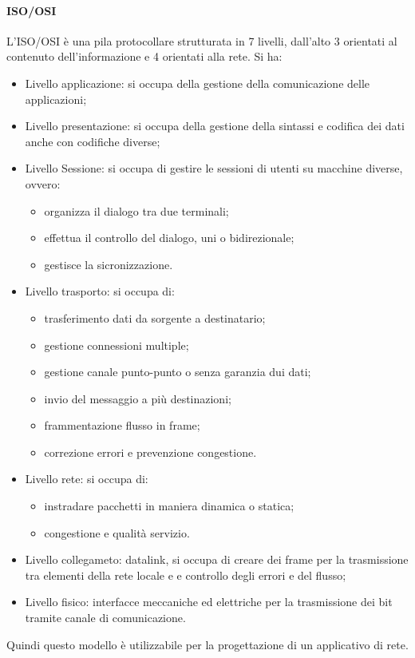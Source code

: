 \documentclass{subfiles}
\begin{document}
    \paragraph{ISO/OSI}
    L'ISO/OSI è una pila protocollare strutturata in 7 livelli, dall'alto 3 orientati al contenuto dell'informazione e 4 orientati 
    alla rete. Si ha:
    \begin{itemize}
        \item Livello applicazione: si occupa della gestione della comunicazione delle applicazioni;
        \item Livello presentazione: si occupa della gestione della sintassi e codifica dei dati anche con codifiche diverse;
        \item Livello Sessione: si occupa di gestire le sessioni di utenti su macchine diverse, ovvero:
            \begin{itemize}
                \item organizza il dialogo tra due terminali;
                \item effettua il controllo del dialogo, uni o bidirezionale;
                \item gestisce la sicronizzazione.
            \end{itemize}
        \item Livello trasporto: si occupa di:
            \begin{itemize}
                \item trasferimento dati da sorgente a destinatario;
                \item gestione connessioni multiple;
                \item gestione canale punto-punto o senza garanzia dui dati;
                \item invio del messaggio a più destinazioni;
                \item frammentazione flusso in frame;
                \item correzione errori e prevenzione congestione.
            \end{itemize}
        \item Livello rete: si occupa di:
            \begin{itemize}
                \item instradare pacchetti in maniera dinamica o statica;
                \item congestione e qualità servizio.
            \end{itemize}
        \item Livello collegameto: datalink, si occupa di creare dei frame per la trasmissione tra elementi della rete locale e 
        e controllo degli errori e del flusso;
        \item Livello fisico: interfacce meccaniche ed elettriche per la trasmissione dei bit tramite canale di comunicazione.
    \end{itemize}
    Quindi questo modello è utilizzabile per la progettazione di un applicativo di rete.
\end{document}
